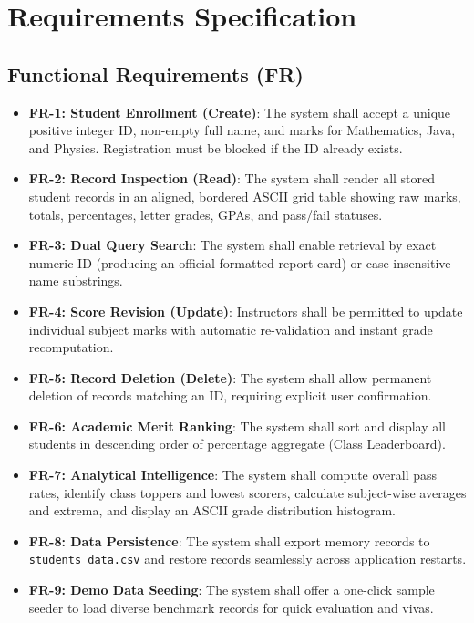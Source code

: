 \documentclass[12pt,a4paper]{report}
\begin{document}
\chapter{Requirements Specification}

\section{Functional Requirements (FR)}
\begin{itemize}
    \item \textbf{FR-1: Student Enrollment (Create)}: The system shall accept a unique positive integer ID, non-empty full name, and marks for Mathematics, Java, and Physics. Registration must be blocked if the ID already exists.
    \item \textbf{FR-2: Record Inspection (Read)}: The system shall render all stored student records in an aligned, bordered ASCII grid table showing raw marks, totals, percentages, letter grades, GPAs, and pass/fail statuses.
    \item \textbf{FR-3: Dual Query Search}: The system shall enable retrieval by exact numeric ID (producing an official formatted report card) or case-insensitive name substrings.
    \item \textbf{FR-4: Score Revision (Update)}: Instructors shall be permitted to update individual subject marks with automatic re-validation and instant grade recomputation.
    \item \textbf{FR-5: Record Deletion (Delete)}: The system shall allow permanent deletion of records matching an ID, requiring explicit user confirmation.
    \item \textbf{FR-6: Academic Merit Ranking}: The system shall sort and display all students in descending order of percentage aggregate (Class Leaderboard).
    \item \textbf{FR-7: Analytical Intelligence}: The system shall compute overall pass rates, identify class toppers and lowest scorers, calculate subject-wise averages and extrema, and display an ASCII grade distribution histogram.
    \item \textbf{FR-8: Data Persistence}: The system shall export memory records to \texttt{students\_data.csv} and restore records seamlessly across application restarts.
    \item \textbf{FR-9: Demo Data Seeding}: The system shall offer a one-click sample seeder to load diverse benchmark records for quick evaluation and vivas.
\end{itemize}
\end{document}
